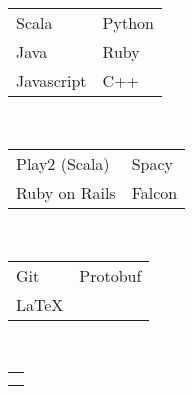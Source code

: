 {		
		\majorsection{\awards} 
		\awardAmplify 
		\awardGoldenTicket 
		\awardEbayApi 
		
		\majorsection{\projects} 
		\projectParasite 
		\projectPytext 
		
		\majorsection{\educationhistory} 
		\educationUW 
		\educationEvergreen 
		\educationHyogo
	}{ %
		
		\noindent\begin{minipage}[t]{0.275\textwidth}
			
			\sidesection{\educationhistory} \quarterlinebreak\\
			\educationUW 
			\educationEvergreen
			\educationHyogo
			
			\sidesection{\coursework} \\
			\sidebarcoursework
			
			
			\sidesection{\skills} \\ 
			\textbf{\skillsprogramminglanguages} \\
			\begin{tabular}{l l}
				Scala &  Python  \\ 
				Java  & Ruby  \\ 
				Javascript & C++
			\end{tabular}
			
			\textbf{\skillsframeworks} \\
			\begin{tabular}{l l}
				Play2 (Scala) & Spacy  \\
				Ruby on Rails & Falcon 
			\end{tabular}
			
			\textbf{\skillsmisc} \\
			\begin{tabular}{l l}
				Git & Protobuf \\
				\LaTeX
			\end{tabular}
			
			\textbf{\skillslanguage} \\
			\begin{tabular}{l}
				\skillenglish \\
				\skilljapanese
			\end{tabular} \quarterlinebreak \\
			
			
		\end{minipage}
		\hfill
		\begin{minipage}[t]{0.7\textwidth}
			\majorsection{\experience} 
			\jobexpEbay
			\jobexpGDIIntern
		\majorsection{\awards} 
		\awardAmplify 
		\awardGoldenTicket 
		\awardEbayApi 
		
		\majorsection{\projects} 
		\projectParasite 
		\projectPytext 
		\end{minipage}
		
	}
	
